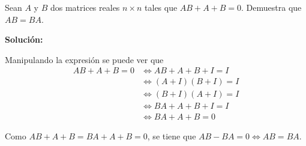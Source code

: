 \documentclass[../../main.tex]{subfiles}
\begin{document}
  \begin{shaded}
    Sean $A$ y $B$ dos matrices reales $n \times n$ tales que $A B + A + B = 0$. Demuestra que $A B = B A$.
  \end{shaded}

  \textbf{Solución:}

  Manipulando la expresión se puede ver que
  \begin{equation*}
    \begin{split}
      A B + A + B = 0 & \iff
      A B + A + B + I = I \\ & \iff
      (A + I) (B + I) = I \\ & \iff
      (B + I) (A + I) = I \\ & \iff
      B A + A + B + I = I \\ & \iff
      B A + A + B = 0
    \end{split}
  \end{equation*}

  Como $A B + A + B = B A + A + B = 0$, se tiene que $A B - B A = 0 \iff A B = B A$.
\end{document}
